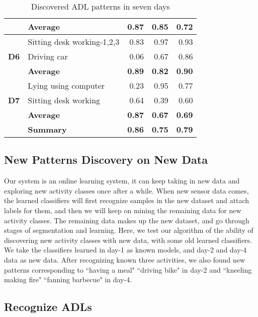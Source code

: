 \documentclass{sigchi}
\begin{document}
\begin{table}[htbp]
\begin{tabular}{llrrr}
          & \textbf{Average} & \textbf{0.87 } & \textbf{0.85 } & \textbf{0.72 } \\
          \hline
    \multirow{3}[0]{*}{\textbf{D6}} & Sitting desk working-1,2,3 & 0.83  & 0.97  & 0.93  \\
          & Driving car & 0.06  & 0.67  & 0.86  \\
          & \textbf{Average} & \textbf{0.89 } & \textbf{0.82 } & \textbf{0.90 } \\
          \hline
    \multirow{3}[0]{*}{\textbf{D7}} & Lying using computer & 0.23  & 0.95  & 0.77  \\
          & Sitting desk working & 0.64  & 0.39  & 0.60  \\
          & \textbf{Average} & \textbf{0.87 } & \textbf{0.67 } & \textbf{0.69 } \\
          \hline
    \textbf{} & \textbf{Summary} & \textbf{0.86 } & \textbf{0.75 } & \textbf{0.79 } \\
    \bottomrule
    \end{tabular}%
  \caption{Discovered ADL patterns in seven days}
  \label{tab:result-seven-days}%
\end{table}%


\subsection{New Patterns Discovery on New Data}
    \label{subsec.exp.discover-new-classes}

    Our system is an online learning system, it can keep taking in new data and exploring new activity classes once after a while.
    When new sensor data comes, the learned classifiers will first recognize samples in the new dataset and attach labels for them, and then we will keep on mining the remaining data for new activity classes.
    The remaining data makes up the new dataset, and go through stages of segmentation and learning.
    Here, we test our algorithm of the ability of discovering new activity classes with new data, with some old learned classifiers.
    We take the classifiers learned in day-1 as known models, and day-2 and day-4 data as new data.
    After recognizing known three activities, we also found new patterns corresponding to ``having a meal" ``driving bike" in day-2 and ``kneeling making fire" ``fanning barbecue" in day-4.

    \subsection{Recognize ADLs}
    \label{subsec.exp.recognize-performance}
\end{document}
